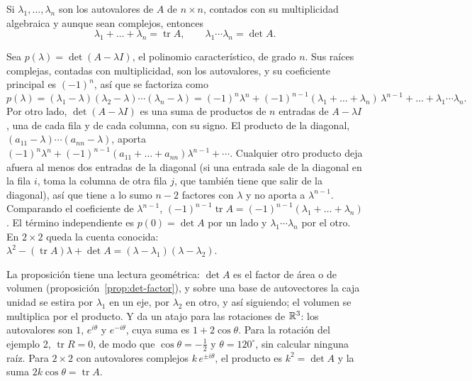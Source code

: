 \begin{proposicion}\label{prop:traza-det}
Si \(\lambda_1,\dots,\lambda_n\) son los autovalores de \(A\) de \(n\times n\), contados con
su multiplicidad algebraica y aunque sean complejos, entonces
\[
  \lambda_1+\dots+\lambda_n=\operatorname{tr}A,\qquad
  \lambda_1\cdots\lambda_n=\det A .
\]
\end{proposicion}

\begin{demostracion}
Sea \(p(\lambda)=\det(A-\lambda I)\), el polinomio característico, de grado \(n\). Sus
raíces complejas, contadas con multiplicidad, son los autovalores, y su coeficiente
principal es \((-1)^n\), así que se factoriza como
\[
  p(\lambda)=(\lambda_1-\lambda)(\lambda_2-\lambda)\cdots(\lambda_n-\lambda)
  =(-1)^n\lambda^n+(-1)^{n-1}(\lambda_1+\dots+\lambda_n)\,\lambda^{n-1}+\dots+
  \lambda_1\cdots\lambda_n .
\]
Por otro lado, \(\det(A-\lambda I)\) es una suma de productos de \(n\) entradas de
\(A-\lambda I\), una de cada fila y de cada columna, con su signo. El producto de la
diagonal, \((a_{11}-\lambda)\cdots(a_{nn}-\lambda)\), aporta
\((-1)^n\lambda^n+(-1)^{n-1}(a_{11}+\dots+a_{nn})\lambda^{n-1}+\cdots\). Cualquier otro
producto deja afuera al menos dos entradas de la diagonal (si una entrada sale de la
diagonal en la fila \(i\), toma la columna de otra fila \(j\), que también tiene que salir de
la diagonal), así que tiene a lo sumo \(n-2\) factores con \(\lambda\) y no aporta a
\(\lambda^{n-1}\). Comparando el coeficiente de \(\lambda^{n-1}\),
\((-1)^{n-1}\operatorname{tr}A=(-1)^{n-1}(\lambda_1+\dots+\lambda_n)\). El término
independiente es \(p(0)=\det A\) por un lado y \(\lambda_1\cdots\lambda_n\) por el otro. En
\(2\times2\) queda la cuenta conocida:
\(\lambda^2-(\operatorname{tr}A)\lambda+\det A=(\lambda-\lambda_1)(\lambda-\lambda_2)\).
\end{demostracion}

La proposición tiene una lectura geométrica: \(\det A\) es el factor de área o de volumen
(proposición~\ref{prop:det-factor}), y sobre una base de autovectores la caja unidad se
estira por \(\lambda_1\) en un eje, por \(\lambda_2\) en otro, y así siguiendo; el volumen se
multiplica por el producto. Y da un atajo para las rotaciones de \(\mathbb{R}^3\): los autovalores
son \(1\), \(e^{i\theta}\) y \(e^{-i\theta}\), cuya suma es \(1+2\cos\theta\). Para la
rotación del ejemplo 2, \(\operatorname{tr}R=0\), de modo que \(\cos\theta=-\tfrac12\) y
\(\theta=120^\circ\), sin calcular ninguna raíz. Para \(2\times2\) con autovalores complejos
\(k\,e^{\pm i\theta}\), el producto es \(k^2=\det A\) y la suma \(2k\cos\theta=\operatorname{tr}A\).

